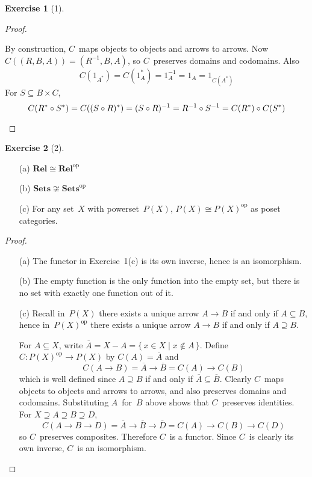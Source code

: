 \documentclass[letterpaper,12pt]{article}
\newcommand{\iso}{\cong}
\newcommand{\after}{\circ}
\newcommand{\comp}[1]{\overline{#1}}
\newcommand{\inv}[1]{#1^{-1}}
\renewcommand{\star}[1]{#1^{*}}
\newcommand{\cat}[1]{\mathbf{#1}}
\newcommand{\dual}[1]{#1^{\mathrm{op}}}
\newcommand{\2}{\cat{2}}
\newcommand{\Rel}{\cat{Rel}}
\newcommand{\Relop}{\dual{\Rel}}
\newcommand{\Sets}{\cat{Sets}}
\newcommand{\Setsop}{\dual{\Sets}}
\theoremstyle{definition}
\newtheorem*{exer}{Exercise}
\theoremstyle{remark}
\theoremstyle{direction}
\begin{document}
\begin{exer}[1]
\begin{proof}
\begin{enumerate}[itemsep=0pt]
By construction, \(C\)~maps objects to objects and arrows to arrows. Now \(C((R,B,A))=(\inv{R},B,A)\), so \(C\)~preserves domains and codomains. Also
\[C(1_{\star{A}})=C(\star{1_A})=\inv{1_A}=1_A=1_{C(\star{A})}\]
For \(S\subseteq B\times C\),
\[C(\star{R}\after\star{S})=C(\star{(S\after R)})=\inv{(S\after R)}=\inv{R}\after\inv{S}=C(\star{R})\after C(\star{S})\qedhere\]
\end{enumerate}
\end{proof}
\end{exer}

\begin{exer}[2]\
\begin{enumerate}[itemsep=0pt]
\item[(a)] \(\Rel\iso\Relop\)
\item[(b)] \(\Sets\not\iso\Setsop\)
\item[(c)] For any set~\(X\) with powerset~\(P(X)\), \(P(X)\iso\dual{P(X)}\) as poset categories.
\end{enumerate}
\begin{proof}\
\begin{enumerate}[itemsep=0pt]
\item[(a)] The functor in Exercise~1(c) is its own inverse, hence is an isomorphism.
\item[(b)] The empty function is the only function into the empty set, but there is no set with exactly one function out of it.
\item[(c)] Recall in~\(P(X)\) there exists a unique arrow \(A\to B\) if and only if \(A\subseteq B\), hence in~\(\dual{P(X)}\) there exists a unique arrow \(A\to B\) if and only if \(A\supseteq B\).

For \(A\subseteq X\), write \(\comp{A}=X-A=\{\,x\in X\mid x\not\in A\,\}\). Define \(C:\dual{P(X)}\to P(X)\) by \(C(A)=\comp{A}\) and
\[C(A\to B)=\comp{A}\to\comp{B}=C(A)\to C(B)\]
which is well defined since \(A\supseteq B\) if and only if \(\comp{A}\subseteq\comp{B}\). Clearly \(C\)~maps objects to objects and arrows to arrows, and also preserves domains and codomains. Substituting \(A\)~for~\(B\) above shows that \(C\)~preserves identities. For \(X\supseteq A\supseteq B\supseteq D\),
\[C(A\to B\to D)=\comp{A}\to\comp{B}\to\comp{D}=C(A)\to C(B)\to C(D)\]
so \(C\)~preserves composites. Therefore \(C\)~is a functor. Since \(C\)~is clearly its own inverse, \(C\)~is an isomorphism.\qedhere
\end{enumerate}
\end{proof}
\end{exer}
\end{document}
